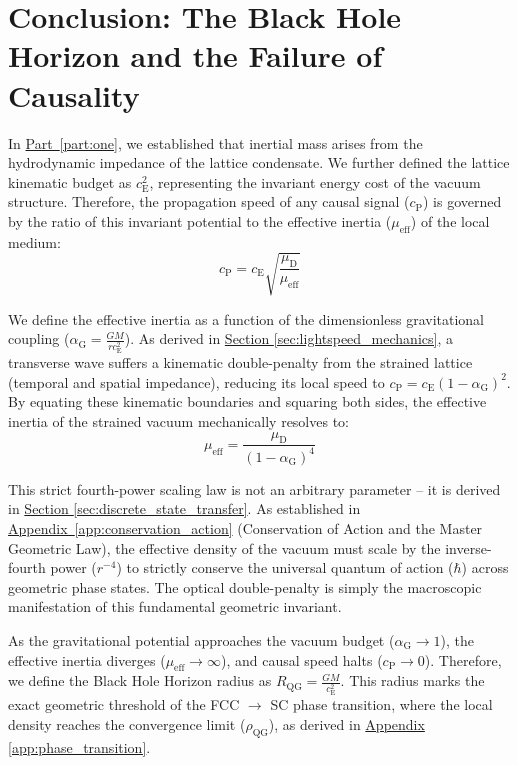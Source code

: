 \section{Conclusion: The Black Hole Horizon and the Failure of Causality}
\label{sec:blackhole_horizon}
In \hyperref[part:one]{Part~\ref{part:one}}, we established that inertial mass arises from the hydrodynamic impedance of the lattice condensate. We further defined the lattice kinematic budget as $c_{\mathrm{E}}^2$, representing the invariant energy cost of the vacuum structure. Therefore, the propagation speed of any causal signal ($c_{\mathrm{P}}$) is governed by the ratio of this invariant potential to the effective inertia ($\mu_{\mathrm{eff}}$) of the local medium:
\begin{equation}
    c_{\mathrm{P}} = c_{\mathrm{E}} \sqrt{\frac{\mu_{\mathrm{D}}}{\mu_{\mathrm{eff}}}}
\end{equation}

We define the effective inertia as a function of the dimensionless gravitational coupling ($\alpha_{\mathrm{G}} = \frac{GM}{r c_{\mathrm{E}}^2}$). As derived in \hyperref[sec:lightspeed_mechanics]{Section \ref*{sec:lightspeed_mechanics}}, a transverse wave suffers a kinematic double-penalty from the strained lattice (temporal and spatial impedance), reducing its local speed to $c_{\mathrm{P}} = c_{\mathrm{E}}(1 - \alpha_{\mathrm{G}})^2$. By equating these kinematic boundaries and squaring both sides, the effective inertia of the strained vacuum mechanically resolves to:
\begin{equation}
    \mu_{\mathrm{eff}} = \frac{\mu_{\mathrm{D}}}{(1 - \alpha_{\mathrm{G}})^4}
\end{equation}

This strict fourth-power scaling law is not an arbitrary parameter -- it is derived in \hyperref[sec:discrete_state_transfer]{Section \ref*{sec:discrete_state_transfer}}. As established in \hyperref[app:conservation_action]{Appendix~\ref*{app:conservation_action}} (Conservation of Action and the Master Geometric Law), the effective density of the vacuum must scale by the inverse-fourth power ($r^{-4}$) to strictly conserve the universal quantum of action ($\hbar$) across geometric phase states. The optical double-penalty is simply the macroscopic manifestation of this fundamental geometric invariant.

As the gravitational potential approaches the vacuum budget ($\alpha_{\mathrm{G}} \to 1$), the effective inertia diverges ($\mu_{\mathrm{eff}} \to \infty$), and causal speed halts ($c_{\mathrm{P}} \to 0$). Therefore, we define the Black Hole Horizon radius as $R_{\mathrm{QG}} = \frac{GM}{c_{\mathrm{E}}^2}$. This radius marks the exact geometric threshold of the FCC $\to$ SC phase transition, where the local density reaches the convergence limit ($\rho_{\mathrm{QG}}$), as derived in \hyperref[app:phase_transition]{Appendix \ref*{app:phase_transition}}.

